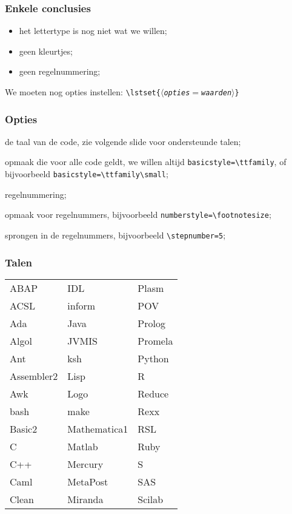 \begin{frame}
  \frametitle{Enkele conclusies}

  \begin{itemize}
    \item het lettertype is nog niet wat we willen;
    \item geen kleurtjes;
    \item geen regelnummering;
  \end{itemize}

  We moeten nog opties instellen:
  \texttt{\textbackslash lstset\{$\langle$\textsl{opties$=$waarden}$\rangle$\}}
\end{frame}

\begin{frame}[fragile]
  \frametitle{Opties}

  \begin{description}
    \item[\texttt{language}] de taal van de code, zie volgende slide voor ondersteunde talen;
    \item[\texttt{basicstyle}] opmaak die voor alle code geldt, we willen altijd \verb|basicstyle=\ttfamily|, of bijvoorbeeld \verb|basicstyle=\ttfamily\small|;
    \item[\texttt{numbers}] regelnummering;
    \item[\texttt{numberstyle}] opmaak voor regelnummers, bijvoorbeeld \verb|numberstyle=\footnotesize|;
    \item[\texttt{stepnumber}] sprongen in de regelnummers, bijvoorbeeld \verb|\stepnumber=5|;
  \end{description}
\end{frame}

\begin{frame}
  \frametitle{Talen}

  \small
  \begin{tabular}{lll}
    ABAP & IDL & Plasm           \\
    ACSL & inform & POV         \\
    Ada & Java & Prolog         \\
    Algol & JVMIS & Promela     \\
    Ant & ksh & Python          \\
    Assembler2 & Lisp & R       \\
    Awk & Logo & Reduce         \\
    bash & make & Rexx          \\
    Basic2 & Mathematica1 & RSL \\
    C & Matlab & Ruby           \\
    C++ & Mercury & S           \\
    Caml & MetaPost & SAS       \\
    Clean & Miranda & Scilab    \\
  \end{tabular}
\end{frame}

